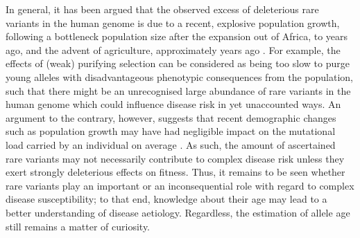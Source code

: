 In general, it has been argued that the observed excess of deleterious rare variants in the human genome is due to a recent, explosive population growth, following a bottleneck population size after the expansion out of Africa,  to  years ago, and the advent of agriculture, approximately  years ago \citep{Coventry:2010cqa,Keinan:2012kl,Tennessen:2012ck}.
For example, the effects of (weak) purifying selection can be considered as being too slow to purge young alleles with disadvantageous phenotypic consequences from the population, such that there might be an unrecognised large abundance of rare variants in the human genome which could influence disease risk in yet unaccounted ways.
An argument to the contrary, however, suggests that recent demographic changes such as population growth may have had negligible impact on the mutational load carried by an individual on average \citep{Simons:2014fj}.
As such, the amount of ascertained rare variants may not necessarily contribute to complex disease risk unless they exert strongly deleterious effects on fitness.
Thus, it remains to be seen whether rare variants play an important or an inconsequential role with regard to complex disease susceptibility; to that end, knowledge about their age may lead to a better understanding of disease aetiology.
Regardless, the estimation of allele age still remains a matter of curiosity.
